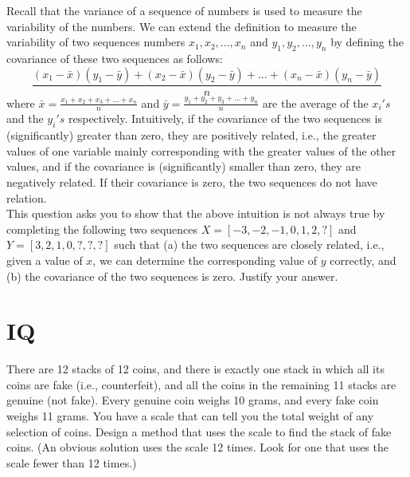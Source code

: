 \documentclass{article}
\begin{document}
\vspace{3\baselineskip}

\noindent Recall that the variance of a sequence of numbers is used to measure the variability of the numbers. We can extend the definition to measure the variability of two sequences numbers $x_1, x_2,...,x_n$ and $y_1, y_2,...,y_n$ by defining the covariance of these two sequences as follows:
$$\frac{(x_1-\bar{x})(y_1-\bar{y}) + (x_2-\bar{x})(y_2-\bar{y}) + ... + (x_n-\bar{x})(y_n-\bar{y})}{n}$$
where $\bar{x} = \frac{x_1 + x_2 + x_3 + ... + x_n}{n}$ and $\bar{y} = \frac{y_1 + y_2 + y_3 + ... + y_n}{n}$ are the average of the $x_i's$ and the $y_i's$ respectively. Intuitively, if the covariance of the two sequences is (significantly) greater than zero, they are positively related, i.e., the greater values of one variable mainly corresponding with the greater values of the other values, and if the covariance is (significantly) smaller than zero, they are negatively related. If their covariance is zero, the two sequences do not have relation.\\
This question asks you to show that the above intuition is not always true by completing the following two sequences $X = [-3, -2, -1, 0, 1, 2, ?]$ and $Y = [3, 2, 1, 0, ?, ?, ?]$ such that (a) the two sequences are closely related, i.e., given a value of $x$, we can determine the corresponding value of $y$ correctly, and (b) the covariance of the two sequences is zero. Justify your answer.


\section{IQ}

\noindent There are 12 stacks of 12 coins, and there is exactly one stack in which all its coins are fake (i.e., counterfeit), and all the coins in the remaining 11 stacks are genuine (not fake). Every genuine coin weighs 10 grams, and every fake coin weighs 11 grams. You have a  scale that can tell you the total weight of any selection of coins. Design a method that uses  the scale to find the stack of fake coins. (An obvious solution uses the scale 12 times. Look  for one that uses the scale fewer than 12 times.)
\end{document}
